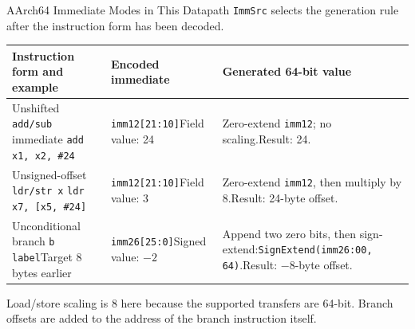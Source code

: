\documentclass[aspectratio=169,11pt,t]{beamer}
\newcommand{\code}[1]{\texttt{#1}}
\begin{document}
\begin{frame}{AArch64 Immediate Modes in This Datapath}
\small
\code{ImmSrc} selects the generation rule after the instruction form has been decoded.
\begin{center}
\renewcommand{\arraystretch}{1.15}
\setlength{\tabcolsep}{5pt}
\begin{tabular}{>{\raggedright\arraybackslash}p{3.5cm}>{\raggedright\arraybackslash}p{3.1cm}>{\raggedright\arraybackslash}p{6.3cm}}
\toprule
\rowcolor{white}
\textbf{Instruction form and example} & \textbf{Encoded immediate} & \textbf{Generated 64-bit value} \\
\midrule
Unshifted \code{add/sub} immediate\newline
\code{add x1, x2, \#24}
& \code{imm12[21:10]}\newline Field value: 24
& Zero-extend \code{imm12}; no scaling.\newline Result: 24. \\
\midrule
Unsigned-offset \code{ldr/str x}\newline
\code{ldr x7, [x5, \#24]}
& \code{imm12[21:10]}\newline Field value: 3
& Zero-extend \code{imm12}, then multiply by 8.\newline Result: 24-byte offset. \\
\midrule
Unconditional branch\newline
\code{b label}\newline Target 8 bytes earlier
& \code{imm26[25:0]}\newline Signed value: $-2$
& Append two zero bits, then sign-extend:\newline \code{SignExtend(imm26:00, 64)}.\newline Result: $-8$-byte offset. \\
\bottomrule
\end{tabular}
\end{center}
\scriptsize
Load/store scaling is 8 here because the supported transfers are 64-bit. Branch offsets are added to the address of the branch instruction itself.
\end{frame}
\end{document}
